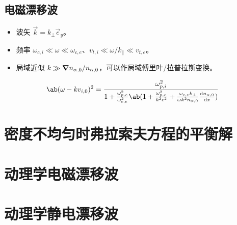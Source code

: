 \subsection{电磁漂移波}

\begin{itemize}
    \item 波矢 $\vec{k} = k_\perp \vec{e}_y$。
    \item 频率 $\omega_{c,i} \ll \omega \ll \omega_{c,e}$、$v_{t,i} \ll \omega / k_\parallel \ll v_{t,e}$。
    \item 局域近似 $k \gg \bm{\nabla}{n_{\alpha,0}}/n_{\alpha,0}$，可以作局域傅里叶/拉普拉斯变换。
\end{itemize}

\begin{equation}
\ab(\omega - k v_{i,0})^2 = \frac{\omega_{p,i}^2}{
    1 + \frac{\omega_{p,e}^2}{\omega_{c,e}^2} \ab(
    1 + \frac{\omega_{p,e}^2}{k^2 c^2}
    + \frac{\omega_{c,e} k_\perp}{\omega k^2 n_{\alpha,0}} \odv{n_{\alpha,0}}{x}
)}
\end{equation}

\section{密度不均匀时弗拉索夫方程的平衡解}

\section{动理学电磁漂移波}

\section{动理学静电漂移波}
